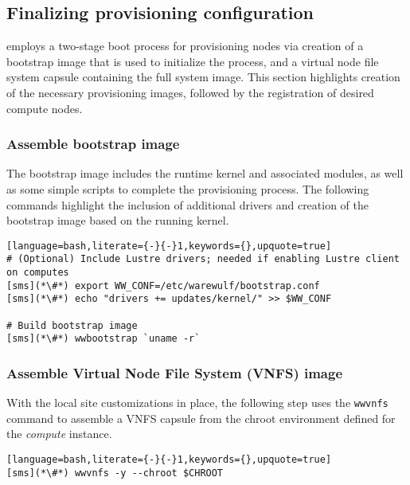 \subsection{Finalizing provisioning configuration} \label{sec:assemble_bootstrap}

\Warewulf{} employs a two-stage boot process for provisioning nodes via
creation of a bootstrap image that is used to initialize the process, and a virtual node
file system capsule containing the full system image. This section highlights
creation of the necessary provisioning images, followed by the registration of
desired compute nodes.

\subsubsection{Assemble bootstrap image}

The bootstrap image includes the runtime kernel and associated modules, as well
as some simple scripts to complete the provisioning process. The
following commands highlight the inclusion of additional drivers and creation
of the bootstrap image based on the running kernel.

\begin{lstlisting}[language=bash,literate={-}{-}1,keywords={},upquote=true]
# (Optional) Include Lustre drivers; needed if enabling Lustre client on computes
[sms](*\#*) export WW_CONF=/etc/warewulf/bootstrap.conf
[sms](*\#*) echo "drivers += updates/kernel/" >> $WW_CONF

# Build bootstrap image
[sms](*\#*) wwbootstrap `uname -r`
\end{lstlisting}

\subsubsection{Assemble Virtual Node File System (VNFS) image}

With the local site customizations in place, the following step uses the
\texttt{wwvnfs} command to assemble a VNFS capsule from the chroot environment
defined for the {\em compute} instance. 

\begin{lstlisting}[language=bash,literate={-}{-}1,keywords={},upquote=true]
[sms](*\#*) wwvnfs -y --chroot $CHROOT
\end{lstlisting}

